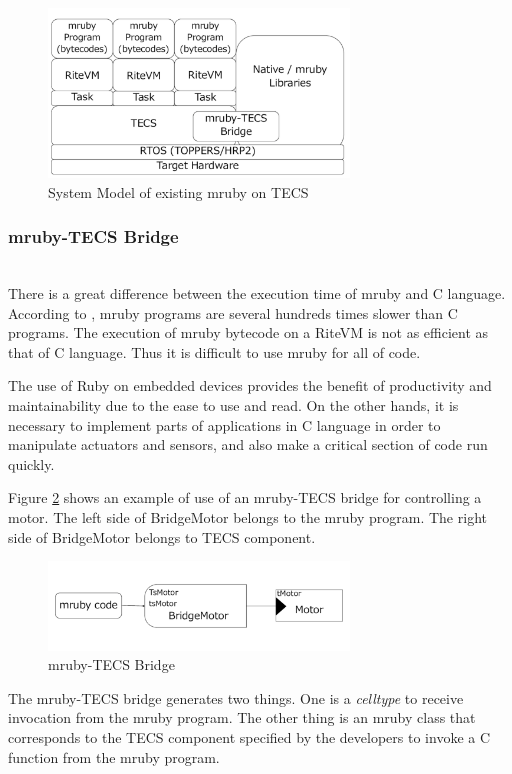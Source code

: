 \documentclass[conference,compsoc]{IEEEtran}
\begin{document}
\begin{figure}[t]
    \centering
    \includegraphics[width=8cm,clip]{figure/mrubyontecs.pdf}
    \caption{System Model of existing mruby on TECS}
    \label{fig:mrubyontecs}
\end{figure}

\subsubsection{mruby-TECS Bridge}\mbox{}\\

There is a great difference between the execution time of mruby and C language.
According to  \cite{par:mrubyonTECS}, mruby programs are several hundreds times slower than C programs.
The execution of mruby bytecode on a RiteVM is not as efficient as that of C language.
Thus it is difficult to use mruby for all of code.

The use of Ruby on embedded devices provides the benefit of productivity and maintainability due to the ease to use and read.
On the other hands, it is necessary to implement parts of applications in C language in order to manipulate actuators and sensors, and also make a critical section of code run quickly.

Figure \ref{fig:mruby_TECS_bridge} shows an example of use of an mruby-TECS bridge for controlling a motor.
The left side of BridgeMotor belongs to the mruby program.
The right side of BridgeMotor belongs to TECS component.
\begin{figure}[t]
    \centering
    \includegraphics[width=8cm,clip]{figure/mruby_TECS_bridge.pdf}
    \caption{mruby-TECS Bridge}
    \label{fig:mruby_TECS_bridge}
\end{figure}

The mruby-TECS bridge generates two things.
One is a {\it celltype} to receive invocation from the mruby program.
The other thing is an mruby class that corresponds to the TECS component specified by the developers to invoke a C function from the mruby program.
\end{document}
